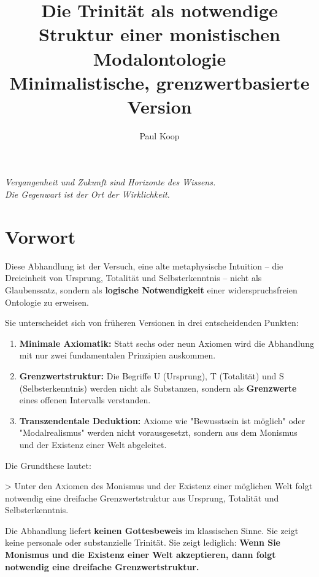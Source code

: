 \documentclass[
]{article}
\title{Die Trinität als notwendige Struktur einer monistischen Modalontologie \\ \large Minimalistische, grenzwertbasierte Version}
\author{Paul Koop}
\date{}
\begin{document}
\maketitle

\begin{center}
\emph{Vergangenheit und Zukunft sind Horizonte des Wissens. \\ Die Gegenwart ist der Ort der Wirklichkeit.}
\end{center}

\newpage
{
\setcounter{tocdepth}{3}
\tableofcontents
}
\newpage

\section{Vorwort}\label{vorwort}

Diese Abhandlung ist der Versuch, eine alte metaphysische Intuition – die Dreieinheit von Ursprung, Totalität und Selbsterkenntnis – nicht als Glaubenssatz, sondern als \textbf{logische Notwendigkeit} einer widerspruchsfreien Ontologie zu erweisen.

Sie unterscheidet sich von früheren Versionen in drei entscheidenden Punkten:

\begin{enumerate}
\item \textbf{Minimale Axiomatik:} Statt sechs oder neun Axiomen wird die Abhandlung mit nur zwei fundamentalen Prinzipien auskommen.
\item \textbf{Grenzwertstruktur:} Die Begriffe U (Ursprung), T (Totalität) und S (Selbsterkenntnis) werden nicht als Substanzen, sondern als \textbf{Grenzwerte} eines offenen Intervalls verstanden.
\item \textbf{Transzendentale Deduktion:} Axiome wie "Bewusstsein ist möglich" oder "Modalrealismus" werden nicht vorausgesetzt, sondern aus dem Monismus und der Existenz einer Welt abgeleitet.
\end{enumerate}

Die Grundthese lautet:

> Unter den Axiomen des Monismus und der Existenz einer möglichen Welt folgt notwendig eine dreifache Grenzwertstruktur aus Ursprung, Totalität und Selbsterkenntnis.

Die Abhandlung liefert \textbf{keinen Gottesbeweis} im klassischen Sinne. Sie zeigt keine personale oder substanzielle Trinität. Sie zeigt lediglich: \textbf{Wenn Sie Monismus und die Existenz einer Welt akzeptieren, dann folgt notwendig eine dreifache Grenzwertstruktur.}
\end{document}
